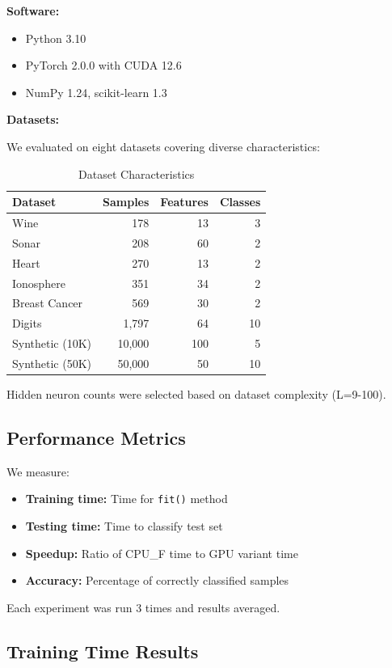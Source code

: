 \documentclass[conference]{IEEEtran}
\begin{document}
\textbf{Software:}
\begin{itemize}
\item Python 3.10
\item PyTorch 2.0.0 with CUDA 12.6
\item NumPy 1.24, scikit-learn 1.3
\end{itemize}

\textbf{Datasets:}

We evaluated on eight datasets covering diverse characteristics:

\begin{table}[h]
\centering
\caption{Dataset Characteristics}
\label{tab:datasets}
\begin{tabular}{lrrr}
\toprule
\textbf{Dataset} & \textbf{Samples} & \textbf{Features} & \textbf{Classes} \\
\midrule
Wine & 178 & 13 & 3 \\
Sonar & 208 & 60 & 2 \\
Heart & 270 & 13 & 2 \\
Ionosphere & 351 & 34 & 2 \\
Breast Cancer & 569 & 30 & 2 \\
Digits & 1,797 & 64 & 10 \\
Synthetic (10K) & 10,000 & 100 & 5 \\
Synthetic (50K) & 50,000 & 50 & 10 \\
\bottomrule
\end{tabular}
\end{table}

Hidden neuron counts were selected based on dataset complexity (L=9-100).

\subsection{Performance Metrics}

We measure:
\begin{itemize}
\item \textbf{Training time:} Time for \texttt{fit()} method
\item \textbf{Testing time:} Time to classify test set
\item \textbf{Speedup:} Ratio of CPU\_F time to GPU variant time
\item \textbf{Accuracy:} Percentage of correctly classified samples
\end{itemize}

Each experiment was run 3 times and results averaged.

\subsection{Training Time Results}
\end{document}
